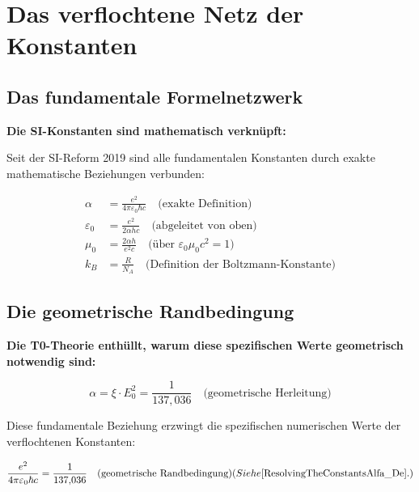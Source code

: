 	\section{Das verflochtene Netz der Konstanten}
	
	\subsection{Das fundamentale Formelnetzwerk}
	
	\begin{derivation}
		\textbf{Die SI-Konstanten sind mathematisch verknüpft:}
		
		Seit der SI-Reform 2019 sind alle fundamentalen Konstanten durch exakte mathematische Beziehungen verbunden:
		
		\begin{align}
			\alpha &= \frac{e^2}{4\pi\varepsilon_0\hbar c} \quad \text{(exakte Definition)} \\
			\varepsilon_0 &= \frac{e^2}{2\alpha h c} \quad \text{(abgeleitet von oben)} \\
			\mu_0 &= \frac{2\alpha h}{e^2 c} \quad \text{(über } \varepsilon_0\mu_0c^2 = 1) \\
			k_B &= \frac{R}{N_A} \quad \text{(Definition der Boltzmann-Konstante)}
		\end{align}
	\end{derivation}
	
	\subsection{Die geometrische Randbedingung}
	
	\begin{insight}
		\textbf{Die T0-Theorie enthüllt, warum diese spezifischen Werte geometrisch notwendig sind:}
		
		\begin{equation}
			\alpha = \xi \cdot E_0^2 = \frac{1}{137{,}036} \quad \text{(geometrische Herleitung)}
		\end{equation}
		
		Diese fundamentale Beziehung erzwingt die spezifischen numerischen Werte der verflochtenen Konstanten:
		
		\begin{equation}
			\frac{e^2}{4\pi\varepsilon_0\hbar c} = \frac{1}{137{,}036} \quad \text{(geometrische Randbedingung)} (Siehe \cite{ResolvingTheConstantsAlfa_De}.)
		\end{equation}
	\end{insight}
	

